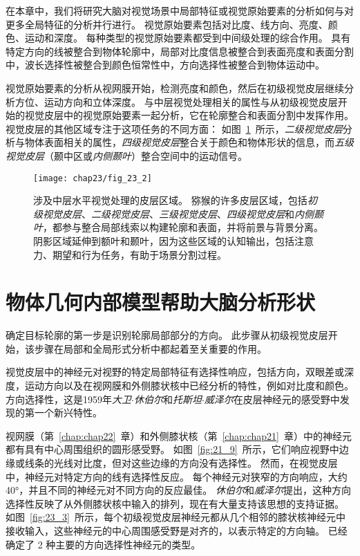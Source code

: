 在本章中，我们将研究大脑对视觉场景中局部特征或视觉原始要素的分析如何与对更多全局特征的分析并行进行。
视觉原始要素包括对比度、线方向、亮度、颜色、运动和深度。
每种类型的视觉原始要素都受到中间级处理的综合作用。
具有特定方向的线被整合到物体轮廓中，局部对比度信息被整合到表面亮度和表面分割中，波长选择性被整合到颜色恒常性中，方向选择性被整合到物体运动中。


视觉原始要素的分析从视网膜开始，检测亮度和颜色，然后在初级视觉皮层继续分析方位、运动方向和立体深度。
与中层视觉处理相关的属性与从初级视觉皮层开始的视觉皮层中的视觉原始要素一起分析，它在轮廓整合和表面分割中发挥作用。
视觉皮层的其他区域专注于这项任务的不同方面：
如图~\ref{fig:23_2}~所示，\textit{二级视觉皮层}分析与物体表面相关的属性，\textit{四级视觉皮层}整合关于颜色和物体形状的信息，而\textit{五级视觉皮层}（颞中区或\textit{内侧颞叶}）整合空间中的运动信号。


\begin{figure}[htbp]
	\centering
	\texttt{[image: chap23/fig\_23\_2]}
	\caption{涉及中层水平视觉处理的皮层区域。
		猕猴的许多皮层区域，包括\textit{初级视觉皮层}、\textit{二级视觉皮层}、\textit{三级视觉皮层}、\textit{四级视觉皮层}和\textit{内侧颞叶}，都参与整合局部线索以构建轮廓和表面，并将前景与背景分离。
		阴影区域延伸到额叶和颞叶，因为这些区域的认知输出，包括注意力、期望和行为任务，有助于场景分割过程。}
	\label{fig:23_2}
\end{figure}



\section{物体几何内部模型帮助大脑分析形状}

确定目标轮廓的第一步是识别轮廓局部部分的方向。
此步骤从初级视觉皮层开始，该步骤在局部和全局形式分析中都起着至关重要的作用。


视觉皮层中的神经元对视野的特定局部特征有选择性响应，包括方向，双眼差或深度，运动方向以及在视网膜和外侧膝状核中已经分析的特性，例如对比度和颜色。 
方向选择性，这是1959年\textit{大卫$\cdot$休伯尔}和\textit{托斯坦$\cdot$威泽尔}在皮层神经元的感受野中发现的第一个新兴特性。


视网膜（第~\ref{chap:chap22}~章）和外侧膝状核（第~\ref{chap:chap21}~章）中的神经元都有具有中心周围组织的圆形感受野。
如图~\ref{fig:21_9}~所示，它们响应视野中边缘或线条的光线对比度，但对这些边缘的方向没有选择性。
然而，在视觉皮层中，神经元对特定方向的线有选择性反应。
每个神经元对狭窄的方向响应，大约40°，并且不同的神经元对不同方向的反应最佳。
\textit{休伯尔}和\textit{威泽尔}提出，这种方向选择性反映了从外侧膝状核中输入的排列，现在有大量支持该思想的支持证据。
如图~\ref{fig:23_3}~所示，每个初级视觉皮层神经元都从几个相邻的膝状核神经元中接收输入，这些神经元的中心周围感受野是对齐的，以表示特定的方向轴。
已经确定了 2 种主要的方向选择性神经元的类型。


